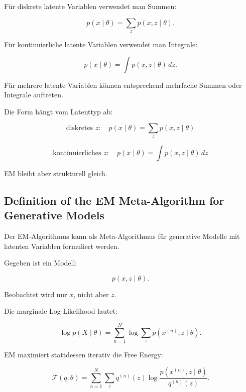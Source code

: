 \documentclass[11pt,a4paper]{scrartcl}
\begin{document}
\begin{solutionbox}
    Für diskrete latente Variablen verwendet man Summen:

    \[
        p(x\mid \theta)
        =
        \sum_z
        p(x,z\mid \theta).
    \]

    Für kontinuierliche latente Variablen verwendet man Integrale:

    \[
        p(x\mid \theta)
        =
        \int
        p(x,z\mid \theta)\,dz.
    \]

    Für mehrere latente Variablen können entsprechend mehrfache Summen oder
    Integrale auftreten.
\end{solutionbox}

\begin{answerbox}
    Die Form hängt vom Latenttyp ab:

    \[
        \boxed{
            \text{diskretes } z:
            \quad
            p(x\mid \theta)
            =
            \sum_z p(x,z\mid \theta)
        }
    \]

    \[
        \boxed{
            \text{kontinuierliches } z:
            \quad
            p(x\mid \theta)
            =
            \int p(x,z\mid \theta)\,dz
        }
    \]

    EM bleibt aber strukturell gleich.
\end{answerbox}

\subsection{Definition of the EM Meta-Algorithm for Generative Models}

\begin{notebox}
    Der EM-Algorithmus kann als Meta-Algorithmus für generative Modelle mit
    latenten Variablen formuliert werden.

    Gegeben ist ein Modell:

    \[
        p(x,z\mid \theta).
    \]

    Beobachtet wird nur \(x\), nicht aber \(z\).
\end{notebox}

\begin{calculationbox}
    Die marginale Log-Likelihood lautet:

    \[
        \log p(X\mid \theta)
        =
        \sum_{n=1}^{N}
        \log
        \sum_z
        p(x^{(n)},z\mid \theta).
    \]

    EM maximiert stattdessen iterativ die Free Energy:

    \[
        \mathcal{F}(q,\theta)
        =
        \sum_{n=1}^{N}
        \sum_z
        q^{(n)}(z)
        \log
        \frac{
            p(x^{(n)},z\mid \theta)
        }{
            q^{(n)}(z)
        }.
    \]
\end{calculationbox}
\end{document}
